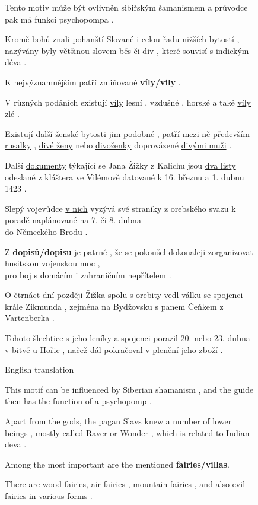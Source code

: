 \documentclass{pbmlarxiv}
\newenvironment{framedexample}{\begin{center}\begin{minipage}[c]{1\hsize}\setlength{\FrameSep}{5pt}\begin{framed}\setlength{\parskip}{4pt}}{\end{framed}\end{minipage}\end{center}}
\newcommand{\englishexamples}[1]{\begin{center}\small English translation #1\end{center}}
\begin{document}
\begin{figure}[p]
    \footnotesize
    \begin{framedexample}
Tento motiv může být ovlivněn sibiřským šamanismem a průvodce pak má funkci psychopompa . 

Kromě bohů znali pohanští Slované i celou řadu \uline{nižších bytostí} , nazývány byly většinou slovem běs či div , které souvisí s indickým déva .

K nejvýznamnějším patří zmiňované \textbf{víly/vily} . 

V různých podáních existují \uline{víly} lesní , vzdušné , horské a také \uline{víly} zlé .  

Existují další ženské bytosti jim podobné , patří mezi ně především \uline{rusalky} , \uline{divé ženy} nebo \uline{divoženky} doprovázené \uline{divými muži} .

\leavevmode

Další \uline{dokumenty} týkající se Jana Žižky z Kalichu jsou \uline{dva listy} odeslané z kláštera ve Vilémově datované k 16. březnu a 1. dubnu 1423 .  

Slepý vojevůdce \uline{v nich} vyzývá své straníky z orebského svazu k poradě naplánované na 7. či 8. dubna\\do Německého Brodu . 

Z \textbf{dopisů/dopisu} je patrné , že se pokoušel dokonaleji zorganizovat husitskou vojenskou moc ,\\pro boj s domácím i zahraničním nepřítelem . 

O čtrnáct dní později Žižka spolu s orebity vedl válku se spojenci krále Zikmunda , zejména na Bydžovsku s panem Čeňkem z Vartenberka . 

Tohoto šlechtice s jeho leníky a spojenci porazil 20. nebo 23. dubna v bitvě u Hořic , načež dál pokračoval v plenění jeho zboží . 
\end{framedexample}

\itshape
\begin{framedexample}
\englishexamples{}

This motif can be influenced by Siberian shamanism , and the guide then has the function of a psychopomp . 

Apart from the gods, the pagan Slavs knew a number of \uline{lower beings} , mostly called Raver or Wonder , which is related to Indian deva .

Among the most important are the mentioned \textbf{fairies/villas}. 

There are wood \uline{fairies}, air \uline{fairies} , mountain \uline{fairies} , and also evil \uline{fairies} in various forms . 


\end{framedexample}
\end{figure}
\end{document}
